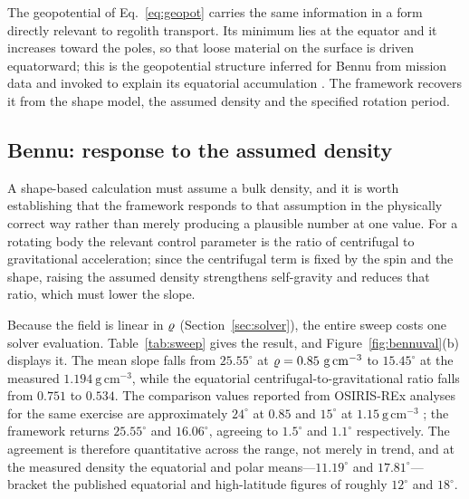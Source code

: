 The geopotential of Eq.~\eqref{eq:geopot} carries the same information in a
form directly relevant to regolith transport. Its minimum lies at the equator
and it increases toward the poles, so that loose material on the surface is
driven equatorward; this is the geopotential structure inferred for Bennu from
mission data and invoked to explain its equatorial accumulation
\citep{scheeres2019,jawin2020}. The framework recovers it from the shape model, the
assumed density and the specified rotation period.

\subsection{Bennu: response to the assumed density}
\label{sec:densitysweep}

A shape-based calculation must assume a bulk density, and it is worth
establishing that the framework responds to that assumption in the physically
correct way rather than merely producing a plausible number at one value. For a
rotating body the relevant control parameter is the ratio of centrifugal to
gravitational acceleration; since the centrifugal term is fixed by the spin and
the shape, raising the assumed density strengthens self-gravity and reduces
that ratio, which must lower the slope.

Because the field is linear in $\varrho$ (Section~\ref{sec:solver}), the entire
sweep costs one solver evaluation. Table~\ref{tab:sweep} gives the result, and
Figure~\ref{fig:bennuval}(b) displays it. The
mean slope falls from $25.55^{\circ}$ at $\varrho = 0.85\ \mathrm{g\,cm^{-3}}$ to
$15.45^{\circ}$ at the measured $1.194\ \mathrm{g\,cm^{-3}}$, while the
equatorial centrifugal-to-gravitational ratio falls from $0.751$ to $0.534$.
The comparison values reported from OSIRIS-REx analyses for the same exercise
are approximately $24^{\circ}$ at $0.85$ and $15^{\circ}$ at
$1.15\ \mathrm{g\,cm^{-3}}$ \citep{scheeres2019}; the framework returns
$25.55^{\circ}$ and $16.06^{\circ}$, agreeing to $1.5^{\circ}$ and
$1.1^{\circ}$ respectively. The agreement is therefore quantitative across the
range, not merely in trend, and at the measured density the equatorial and
polar means---$11.19^{\circ}$ and $17.81^{\circ}$---bracket the published
equatorial and high-latitude figures of roughly $12^{\circ}$ and $18^{\circ}$.

